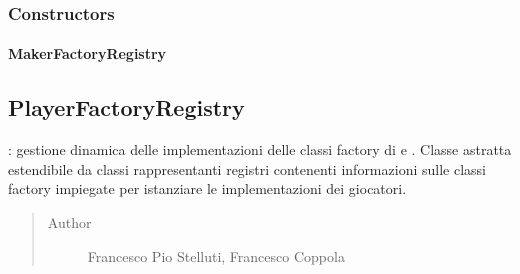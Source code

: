 \documentclass[letterpaper,10pt,italian]{sphinxmanual}
\begin{document}
\subsubsection{Constructors}
\label{\detokenize{source/it/unicam/cs/pa/mastermind/players/MakerFactoryRegistry:constructors}}

\paragraph{MakerFactoryRegistry}
\label{\detokenize{source/it/unicam/cs/pa/mastermind/players/MakerFactoryRegistry:id1}}

\begin{fulllineitems}
\label{\detokenize{source/it/unicam/cs/pa/mastermind/players/MakerFactoryRegistry:it.unicam.cs.pa.mastermind.players.MakerFactoryRegistry.MakerFactoryRegistry(String)}}
\end{fulllineitems}



\subsection{PlayerFactoryRegistry}
\label{\detokenize{source/it/unicam/cs/pa/mastermind/players/PlayerFactoryRegistry:playerfactoryregistry}}\label{\detokenize{source/it/unicam/cs/pa/mastermind/players/PlayerFactoryRegistry::doc}}

\begin{fulllineitems}
\label{\detokenize{source/it/unicam/cs/pa/mastermind/players/PlayerFactoryRegistry:it.unicam.cs.pa.mastermind.players.PlayerFactoryRegistry}}
: gestione dinamica delle implementazioni delle classi factory di  e . Classe astratta estendibile da classi rappresentanti registri contenenti informazioni sulle classi factory impiegate per istanziare le implementazioni dei giocatori.
\begin{quote}\begin{description}
\item[{Author}] \leavevmode
Francesco Pio Stelluti, Francesco Coppola

\end{description}\end{quote}

\end{fulllineitems}
\end{document}
